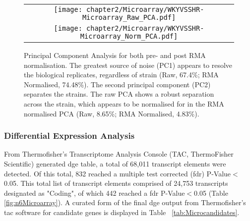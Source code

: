 \begin{figure}[!htbp]
\centering 
\begin{tabular}{c}
\texttt{[image: chapter2/Microarray/WKYVSSHR-Microarray\_Raw\_PCA.pdf]} \\
\texttt{[image: chapter2/Microarray/WKYVSSHR-Microarray\_Norm\_PCA.pdf]}\\
\end{tabular} 
\caption[Principal Component Analysis for both pre- and post RMA normalisation]{Principal Component Analysis for both pre- and post RMA normalisation. The greatest source of noise (PC1) appears to resolve the biological replicates, regardless of strain (Raw, 67.4\%; RMA Normalised, 74.48\%). The second principal component (PC2) separates the strains. The raw PCA shows a robust separation across the strain, which appears to be normalised for in the RMA normalised PCA (Raw, 8.65\%; RMA Normalised, 4.83\%).}
\label{fig:microarraypca}
\end{figure}

\subsubsection{Differential Expression Analysis}

From Thermofisher's Transcriptome Analysis Console (TAC, ThermoFisher Scientific) generated \acrshort{dge} table, a total of 68,011 transcript elements were detected. Of this total, 832 reached a multiple test corrected (\acrshort{fdr}) P-Value$<$0.05. This total list of transcript elements comprised of 24,753 transcripts designated as "Coding", of which 442 reached a \acrshort{fdr} P-Value$<$0.05 (Table \ref{fig:n6Microarray}). A curated form of the final \acrshort{dge} output from Thermofisher's \acrfull{tac} software for candidate genes is displayed in Table ~\ref{tab:Microcandidates}.

